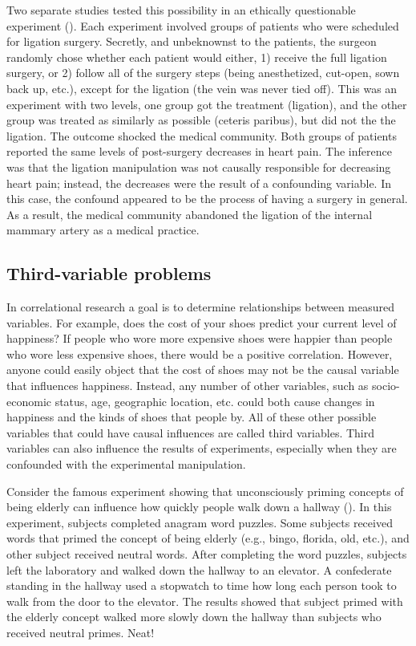 Two separate studies tested this possibility in an ethically questionable experiment (). Each experiment involved groups of patients who were scheduled for ligation surgery. Secretly, and unbeknownst to the patients, the surgeon randomly chose whether each patient would either, 1) receive the full ligation surgery, or 2) follow all of the surgery steps (being anesthetized, cut-open, sown back up, etc.), except for the ligation (the vein was never tied off). This was an experiment with two levels, one group got the treatment (ligation), and the other group was treated as similarly as possible (ceteris paribus), but did not the the ligation. The outcome shocked the medical community. Both groups of patients reported the same levels of post-surgery decreases in heart pain. The inference was that the ligation manipulation was not causally responsible for decreasing heart pain; instead, the decreases were the result of a confounding variable. In this case, the confound appeared to be the process of having a surgery in general. As a result, the medical community abandoned the ligation of the internal mammary artery as a medical practice.

\subsection{Third-variable problems}

In correlational research a goal is to determine relationships between measured variables. For example, does the cost of your shoes predict your current level of happiness? If people who wore more expensive shoes were happier than people who wore less expensive shoes, there would be a positive correlation. However, anyone could easily object that the cost of shoes may not be the causal variable that influences happiness. Instead, any number of other variables, such as socio-economic status, age, geographic location, etc. could both cause changes in happiness and the kinds of shoes that people by. All of these other possible variables that could have causal influences are called third variables. Third variables can also influence the results of experiments, especially when they are confounded with the experimental manipulation.

Consider the famous experiment showing that unconsciously priming concepts of being elderly can influence how quickly people walk down a hallway (). In this experiment, subjects completed anagram word puzzles. Some subjects received words that primed the concept of being elderly (e.g., bingo, florida, old, etc.), and other subject received neutral words. After completing the word puzzles, subjects left the laboratory and walked down the hallway to an elevator. A confederate standing in the hallway used a stopwatch to time how long each person took to walk from the door to the elevator. The results showed that subject primed with the elderly concept walked more slowly down the hallway than subjects who received neutral primes. Neat!

